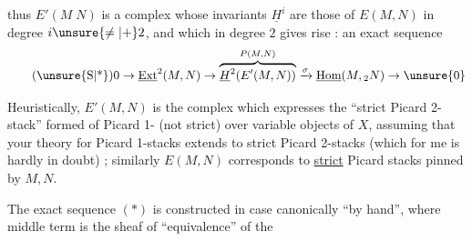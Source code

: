 \margin{\mbox{-- --}}

thus $E'(M\;N)$ is a complex whose invariants $\underline{H}^{i}$ are those of $E(M,N)$ in degree $i\unsure{\ne|+}2$, and which in degree $2$ gives rise : an exact sequence
\begingroup
\makeatletter\tagsleft@true\makeatother
\[
\tag*{(\unsure{S|*})}
0\to\underline{\mathrm{Ext}}^{2}(M,N)\to
\overbrace{\underline{H}^{2}\!\left(E'(M,N)\right)}^{P(M,N)}
\xrightarrow{\sigma}\underline{\mathrm{Hom}}(M,{}_{2}N)\to \unsure{0}
\]
\endgroup

Heuristically, $E'(M,N)$ is the complex which expresses the ``strict Picard 2-stack'' formed of Picard 1- (not  strict)  over variable objects of $X$, assuming that your theory for  Picard 1-stacks extends to strict Picard 2-stacks (which for  me is hardly in doubt) ; similarly $E(M,N)$ corresponds to \uline{strict} Picard stacks pinned by $M,N$.

The exact sequence $(*)$ is constructed in  case canonically ``by hand'', where  middle term is the sheaf of   ``equivalence'' of the

